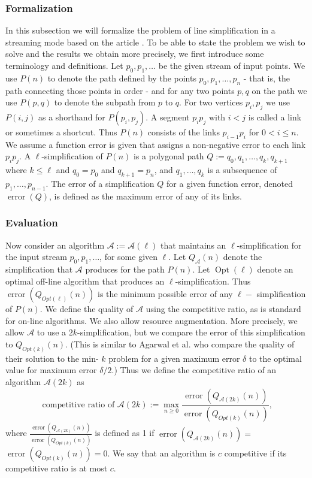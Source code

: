 \documentclass[twoside,12pt, a4paper]{report}
\begin{document}
\subsubsection{Formalization}
In this subsection we will formalize the problem of line simplification in a streaming mode based on the article \cite{abam2007streaming}.
To be able to state the problem we wish to solve and the results we obtain more precisely, we first introduce some terminology and definitions.
Let $p_0, p_1, \ldots$ be the given stream of input points. We use $P(n)$ to denote the path defined by the points
$p_0, p_1, \ldots, p_n$ - that is, the path connecting those points in order - and for any two points $p, q$ on the path we use
$P(p, q)$ to denote the subpath from $p$ to $q$. For two vertices $p_i, p_j$ we use $P(i, j)$ as a shorthand for $P\left(p_i, p_j\right)$.
A segment $p_i p_j$ with $i<j$ is called a link or sometimes a shortcut. Thus $P(n)$ consists of the links $p_{i-1} p_i$ for $0<i \leqslant n$.
We assume a function error is given that assigns a non-negative error to each link $p_i p_j$.
A $\ell$-simplification of $P(n)$ is a polygonal path $Q:=q_0, q_1, \ldots, q_k, q_{k+1}$ where
$k \leqslant \ell$ and $q_0=p_0$ and $q_{k+1}=p_n$, and $q_1, \ldots, q_k$ is a subsequence of
$p_1, \ldots, p_{n-1}$. The error of a simplification $Q$ for a given function error, denoted
$\operatorname{error}(Q)$, is defined as the maximum error of any of its links.

\subsubsection{Evaluation}
Now consider an algorithm $\mathcal{A}:=\mathcal{A}(\ell)$ that maintains an $\ell$-simplification for the input stream $p_0, p_1, \ldots$,
for some given $\ell$. Let $Q_{\mathcal{A}}(n)$ denote the simplification that $\mathcal{A}$ produces for the path $P(n)$. Let $\operatorname{Opt}(\ell)$
denote an optimal off-line algorithm that produces an $\ell$-simplification. Thus $\operatorname{error}\left(Q_{O p t(\ell)}(n)\right)$ is the minimum possible
error of any $\ell-$ simplification of $P(n)$. We define the quality of $\mathcal{A}$ using the competitive ratio, as is standard for on-line algorithms.
We also allow resource augmentation. More precisely, we allow $\mathcal{A}$ to use a $2k$-simplification, but we compare the error of this simplification
to $Q_{O p t(k)}(n)$. (This is similar to Agarwal et al. \cite{agarwal2005near} who compare the quality of their solution to the min- $k$ problem for a given maximum error $\delta$
to the optimal value for maximum error $\delta / 2$.) Thus we define the competitive ratio of an algorithm $\mathcal{A}(2 k)$ as
$$
\text { competitive ratio of } \mathcal{A}(2 k):=\max _{n \geqslant 0} \frac{\operatorname{error}\left(Q_{\mathcal{A}(2 k)}(n)\right)}{\operatorname{error}\left(Q_{O p t(k)}(n)\right)},
$$
where $\frac{\operatorname{error}\left(Q_{\mathcal{A}(2 k)}(n)\right)}{\operatorname{error}\left(Q_{O p t(k)}(n)\right)}$ is defined as
1 if $\operatorname{error}\left(Q_{\mathcal{A}(2 k)}(n)\right)=$ $\operatorname{error}\left(Q_{O p t(k)}(n)\right)=0$.
We say that an algorithm is $c$ competitive if its competitive ratio is at most $c$.
\end{document}
